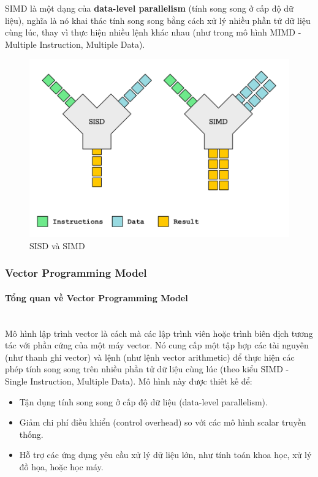 \documentclass[a4paper]{article}
\begin{document}
SIMD là một dạng của \textbf{data-level parallelism} (tính song song ở cấp độ dữ liệu), nghĩa là nó khai thác tính song song bằng cách xử lý nhiều phần tử dữ liệu cùng lúc, thay vì thực hiện nhiều lệnh khác nhau (như trong mô hình MIMD - Multiple Instruction, Multiple Data).
\begin{figure}[H]
     \centering
     \includegraphics[scale=0.3]{assets/simd.png}
     \caption{SISD và SIMD}
     \label{fig:2ss}
 \end{figure}
 
\subsubsection{Vector Programming Model}
\paragraph{Tổng quan về Vector Programming Model} \leavevmode\\

Mô hình lập trình vector là cách mà các lập trình viên hoặc trình biên dịch tương tác với phần cứng của một máy vector. Nó cung cấp một tập hợp các tài nguyên (như thanh ghi vector) và lệnh (như lệnh vector arithmetic) để thực hiện các phép tính song song trên nhiều phần tử dữ liệu cùng lúc (theo kiểu SIMD - Single Instruction, Multiple Data). Mô hình này được thiết kế để:

\begin{itemize}
\item Tận dụng tính song song ở cấp độ dữ liệu (data-level parallelism).
\item Giảm chi phí điều khiển (control overhead) so với các mô hình scalar truyền thống.
\item Hỗ trợ các ứng dụng yêu cầu xử lý dữ liệu lớn, như tính toán khoa học, xử lý đồ họa, hoặc học máy.
\end{itemize}
\end{document}

